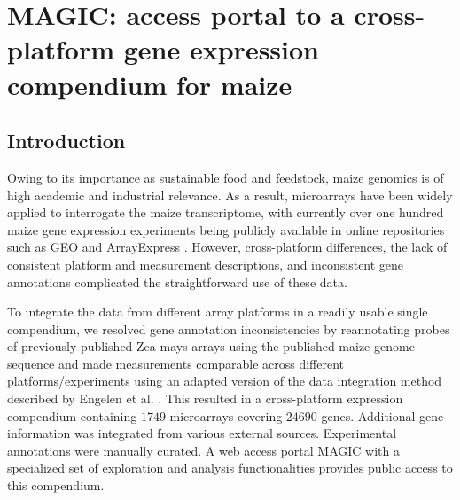 \chapter{MAGIC: access portal to a cross-platform gene expression compendium for maize}\label{ch:magic}


\instructionsintroduction




\section{Introduction}
Owing to its importance as sustainable food and feedstock,
maize genomics is of high academic and industrial relevance.
As a result, microarrays have been widely applied to interrogate
the maize transcriptome, with currently over one hundred maize gene expression 
experiments being publicly available in online repositories
such as GEO \cite{Barrett2011} and ArrayExpress \cite{Parkinson2009}. 
However, cross-platform differences, the lack of
consistent platform and measurement descriptions, and inconsistent 
gene annotations complicated the straightforward
use of these data.

To integrate the data from different array platforms in a readily 
usable single compendium, we resolved gene annotation
inconsistencies by reannotating probes of previously published
Zea mays arrays using the published maize genome sequence \cite{Schnable2009}
 and made measurements comparable
across different platforms/experiments using an adapted version
of the data integration method described by Engelen et al. \cite{Engelen2011}.
This resulted in a cross-platform expression compendium containing 
$1749$ microarrays covering $24690$ genes. Additional
gene information was integrated from various external sources.
Experimental annotations were manually curated. A web access
portal MAGIC with a specialized set of exploration and analysis
functionalities provides public access to this compendium.



